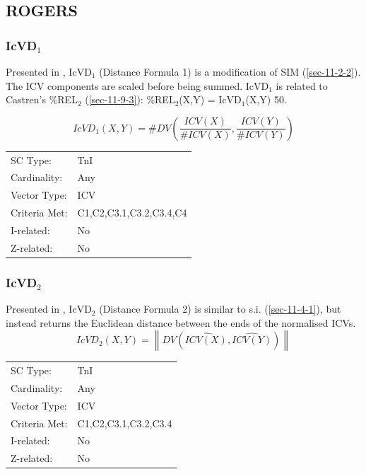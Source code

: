 \documentclass{article}
\begin{document}
\subsection{ROGERS}
\label{sec-11-5}
\subsubsection{IcVD$_{1}$}
\label{sec-11-5-1}

Presented in \citet{Rogers1992}, IcVD$_{1}$ (Distance Formula 1) is a
modification of SIM (\ref{sec-11-2-2}). The ICV components are scaled before being
summed. IcVD$_{1}$ is related to Castren's \%REL$_{2}$ (\ref{sec-11-9-3}):
\%REL$_{2}$(X,Y) = IcVD$_{1}$(X,Y)\texttimes{} 50.  

$$IcVD_{1}(X,Y)=\#DV\left(\frac{ICV(X)}{\#ICV(X)},\frac{ICV(Y)}{\#ICV(Y)}\right)$$


\begin{center}
\begin{tabular}{ll}
 SC Type:       &  TnI                      \\
 Cardinality:   &  Any                      \\
 Vector Type:   &  ICV                      \\
 Criteria Met:  &  C1,C2,C3.1,C3.2,C3.4,C4  \\
 I-related:     &  No                       \\
 Z-related:     &  No                       \\
\end{tabular}
\end{center}
\subsubsection{IcVD$_{2}$}
\label{sec-11-5-2}

Presented in \citet{Rogers1992}, IcVD$_{2}$ (Distance Formula 2) is
similar to s.i. (\ref{sec-11-4-1}), but instead returns the Euclidean distance
between the ends of the normalised ICVs.
$$IcVD_{2}(X,Y)=\left\|DV(\hat{ICV(X)},\hat{ICV(Y)})\right\|$$

\begin{center}
\begin{tabular}{ll}
 SC Type:       &  TnI                   \\
 Cardinality:   &  Any                   \\
 Vector Type:   &  ICV                   \\
 Criteria Met:  &  C1,C2,C3.1,C3.2,C3.4  \\
 I-related:     &  No                    \\
 Z-related:     &  No                    \\
\end{tabular}
\end{center}
\end{document}

